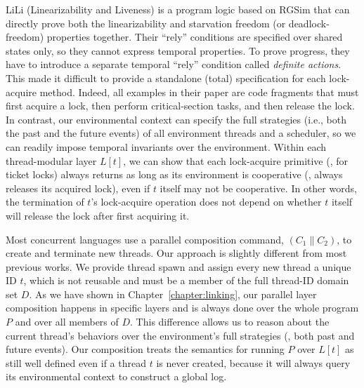 LiLi (Linearizability and Liveness) is a program logic based on RGSim
that can
directly prove both the linearizability and starvation freedom (or
deadlock-freedom) properties together. 
Their ``rely'' conditions are specified
over shared states only, so they cannot express temporal properties. 
To prove progress, they have to introduce a separate temporal ``rely''
condition called {\em definite actions}.  This made it difficult to
provide a standalone (total) specification for each lock-acquire
method.  Indeed, all examples in their paper are code fragments that
must first acquire a lock, then perform critical-section tasks, and then release the
lock. In contrast, our environmental context can specify the full
strategies (i.e., both the past and the future events) of all
environment threads and a scheduler, so we can readily impose
temporal invariants over the environment. Within each thread-modular
layer $L[t]$, we can show that each lock-acquire primitive (\eg, for
ticket locks) always returns as long as its environment is cooperative
(\eg, always releases its acquired lock), even if $t$ itself may not
be cooperative.
In other words, the termination of $t$'s lock-acquire
operation does not depend on whether $t$ itself will release the lock
after first acquiring it.


Most concurrent languages use a
parallel composition command, $(C_1 \| C_2)$, to create and terminate
new threads.  
Our approach is slightly different from most previous works.
We provide thread spawn and assign every new thread a unique ID $t$,
which is not reusable and must be a member of the full thread-ID domain set $D$.
As we have shown in Chapter~\ref{chapter:linking},
our parallel layer composition happens in specific layers and is
always done over the whole program $P$ and over
all members of $D$. 
This difference allows us to reason about the current
thread's behaviors over the environment's full strategies (\ie, both
past and future events).
Our composition treats the semantics for running $P$ over $L[t]$ as still well
defined even if a thread $t$ is never
created, because it will always query its environmental context to
construct a global log.



